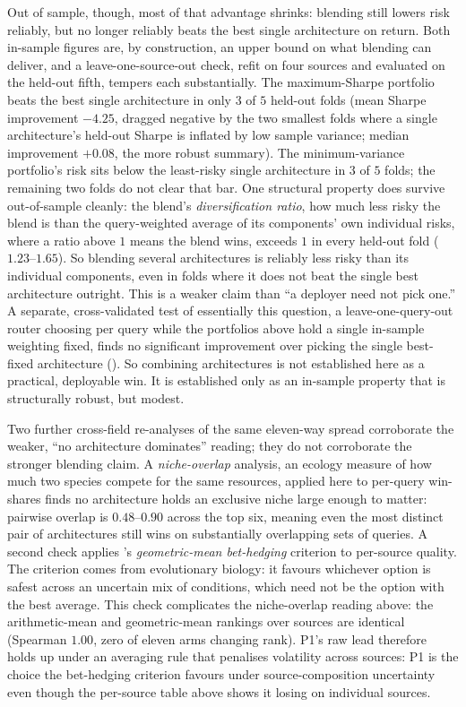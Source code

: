 \documentclass[11pt]{article}
\begin{document}
Out of sample, though, most of that advantage shrinks: blending still lowers risk reliably,
but no longer reliably beats the best single architecture on return. Both in-sample figures
are, by construction, an upper bound on what blending can
deliver, and a leave-one-source-out check, refit on four sources and evaluated on the
held-out fifth, tempers each substantially. The maximum-Sharpe portfolio beats the best
single architecture in only $3$ of $5$ held-out folds (mean Sharpe improvement $-4.25$,
dragged negative by the two smallest folds where a single architecture's held-out Sharpe
is inflated by low sample variance; median improvement $+0.08$, the more robust
summary). The minimum-variance portfolio's risk sits below the least-risky single
architecture in $3$ of $5$ folds; the remaining two folds do not clear that bar. One
structural property does survive out-of-sample cleanly: the blend's
\emph{diversification ratio}, how much less risky the
blend is than the query-weighted average of its components' own individual risks, where
a ratio above $1$ means the blend wins, exceeds $1$ in every held-out fold
($1.23$--$1.65$). So blending several
architectures is reliably less risky than its
individual components, even in folds where it does not beat the single best architecture
outright. This is a weaker claim than ``a deployer need not pick one.''
A separate, cross-validated test of essentially this question,
a leave-one-query-out router choosing per query while the portfolios above hold a single
in-sample weighting fixed,
finds no significant improvement over picking the single best-fixed architecture
(). So combining architectures is not established here as a practical,
deployable win. It is established only as an in-sample property that is structurally
robust, but modest.

Two further cross-field re-analyses of the same eleven-way spread corroborate the
weaker, ``no architecture dominates'' reading; they do not corroborate the stronger
blending claim. A \citet{pianka1973niche} \emph{niche-overlap} analysis, an ecology
measure of how much two species compete for the same resources, applied here to
per-query win-shares finds no architecture holds an exclusive niche large enough to
matter: pairwise overlap is $0.48$--$0.90$ across the top six, meaning even the most
distinct pair of architectures still wins on substantially overlapping sets of queries.
A second check applies \citet{cohen1966optimizing}'s \emph{geometric-mean bet-hedging}
criterion to per-source quality. The criterion comes from evolutionary
biology: it favours whichever option is safest across an uncertain mix of conditions,
which need not be the option with the best average. This check complicates the
niche-overlap reading above: the arithmetic-mean and geometric-mean rankings
over sources are identical (Spearman $1.00$, zero of eleven arms changing rank).
P1's raw lead therefore holds up under an averaging rule that penalises volatility across
sources: P1 is the choice the bet-hedging criterion favours under source-composition uncertainty
even though the per-source table above shows it losing on individual sources.
\end{document}
